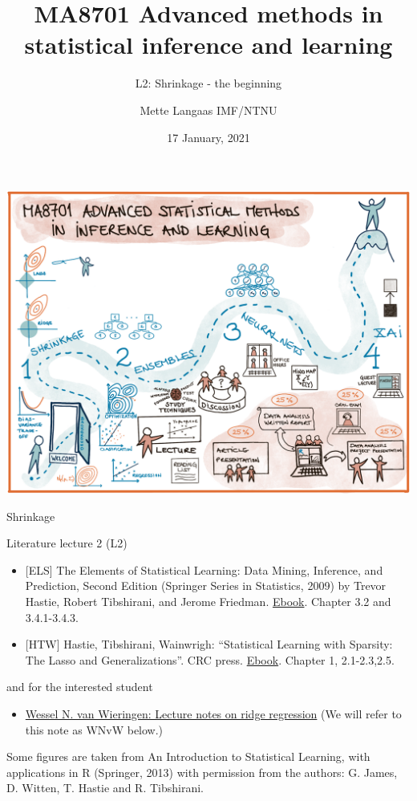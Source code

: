 \documentclass[
  ignorenonframetext,
]{beamer}
\title{MA8701 Advanced methods in statistical inference and learning}
\subtitle{L2: Shrinkage - the beginning}
\author{Mette Langaas IMF/NTNU}
\date{17 January, 2021}
\providecommand{\tightlist}{%
  \setlength{\itemsep}{0pt}\setlength{\parskip}{0pt}}
\begin{document}
\frame{\titlepage}

\begin{frame}

\includegraphics{../overviewv2.png}

\end{frame}

\begin{frame}{Shrinkage}
\protect\hypertarget{shrinkage}{}

\begin{block}{Literature lecture 2 (L2)}

\begin{itemize}
\item
  {[}ELS{]} The Elements of Statistical Learning: Data Mining,
  Inference, and Prediction, Second Edition (Springer Series in
  Statistics, 2009) by Trevor Hastie, Robert Tibshirani, and Jerome
  Friedman.
  \href{https://web.stanford.edu/~hastie/Papers/ESLII.pdf}{Ebook}.
  Chapter 3.2 and 3.4.1-3.4.3.
\item
  {[}HTW{]} Hastie, Tibshirani, Wainwrigh: ``Statistical Learning with
  Sparsity: The Lasso and Generalizations''. CRC press.
  \href{https://trevorhastie.github.io/}{Ebook}. Chapter 1, 2.1-2.3,2.5.
\end{itemize}

and for the interested student

\begin{itemize}
\tightlist
\item
  \href{https://arxiv.org/pdf/1509.09169.pdf}{Wessel N. van Wieringen:
  Lecture notes on ridge regression} (We will refer to this note as WNvW
  below.)
\end{itemize}

Some figures are taken from An Introduction to Statistical Learning,
with applications in R (Springer, 2013) with permission from the
authors: G. James, D. Witten, T. Hastie and R. Tibshirani.

\end{block}

\end{frame}
\end{document}

